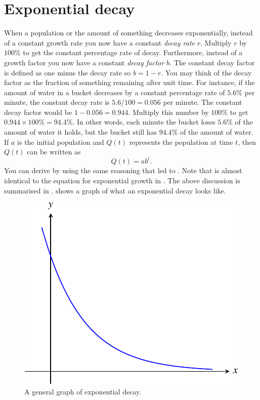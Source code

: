 \documentclass[a4paper,oneside,12pt]{article}
\begin{document}

\section{Exponential decay}

When a population or the amount of something decreases exponentially,
instead of a constant growth rate you now have a constant
\emph{decay rate} $r$.  Multiply $r$ by $100\%$ to get the constant
percentage rate of decay.  Furthermore, instead of a growth factor you
now have a constant \emph{decay factor} $b$.  The constant decay
factor is defined as one minus the decay rate so $b = 1 - r$.  You may
think of the decay factor as the fraction of something remaining after
unit time.  For instance, if the amount of water in a bucket decreases
by a constant percentage rate of $5.6\%$ per minute, the constant
decay rate is $5.6 / 100 = 0.056$ per minute.  The constant decay
factor would be $1 - 0.056 = 0.944$.  Multiply this number by $100\%$
to get $0.944 \times 100\% = 94.4\%$.  In other words, each minute the
bucket loses $5.6\%$ of the amount of water it holds, but the bucket
still has $94.4\%$ of the amount of water.  If $a$ is the initial
population and $Q(t)$ represents the population at time $t$, then
$Q(t)$ can be written as
\begin{equation}
\label{eqn:exponential:exponential_decay}
Q(t)
=
ab^t.
\end{equation}
You can derive  by using
the same reasoning that led to
.  Note that
 is almost identical to
the equation for exponential growth in
.  The above discussion is
summarised in .
 shows a graph of what an
exponential decay looks like.

\begin{figure}[!htbp]
\centering
\includegraphics[scale=1.1]{image/11/exponential-decay.pdf}
\caption{%
  A general graph of exponential decay.
}
\label{fig:exponential:exponential_decay}
\end{figure}
\end{document}
